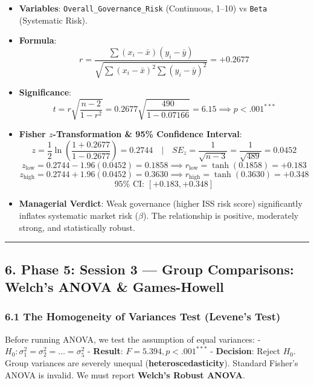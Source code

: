 \documentclass[
]{article}
\providecommand{\tightlist}{%
  \setlength{\itemsep}{0pt}\setlength{\parskip}{0pt}}
\begin{document}
\begin{itemize}
\tightlist
\item
  \textbf{Variables}: \texttt{Overall\_Governance\_Risk} (Continuous,
  1--10) vs \texttt{Beta} (Systematic Risk).
\item
  \textbf{Formula}:
  \[r = \frac{\sum (x_i - \bar{x})(y_i - \bar{y})}{\sqrt{\sum (x_i - \bar{x})^2 \sum (y_i - \bar{y})^2}} = +0.2677\]
\item
  \textbf{Significance}:
  \[t = r \sqrt{\frac{n - 2}{1 - r^2}} = 0.2677 \sqrt{\frac{490}{1 - 0.07166}} = 6.15 \implies p < .001^{***}\]
\item
  \textbf{Fisher \(z\)-Transformation \& 95\% Confidence Interval}:
  \[z = \frac{1}{2} \ln \left(\frac{1 + 0.2677}{1 - 0.2677}\right) = 0.2744 \quad | \quad SE_z = \frac{1}{\sqrt{n - 3}} = \frac{1}{\sqrt{489}} = 0.0452\]
  \[z_{\text{low}} = 0.2744 - 1.96(0.0452) = 0.1858 \implies r_{\text{low}} = \tanh(0.1858) = +0.183\]
  \[z_{\text{high}} = 0.2744 + 1.96(0.0452) = 0.3630 \implies r_{\text{high}} = \tanh(0.3630) = +0.348\]
  \[\text{95%
  \]
\item
  \textbf{Managerial Verdict}: Weak governance (higher ISS risk score)
  significantly inflates systematic market risk (\(\beta\)). The
  relationship is positive, moderately strong, and statistically robust.
\end{itemize}

\begin{center}\rule{0.5\linewidth}{0.5pt}\end{center}

\subsection{6. Phase 5: Session 3 --- Group Comparisons: Welch's ANOVA
\&
Games-Howell}\label{phase-5-session-3-group-comparisons-welchs-anova-games-howell}

\subsubsection{6.1 The Homogeneity of Variances Test (Levene's
Test)}\label{the-homogeneity-of-variances-test-levenes-test}

Before running ANOVA, we test the assumption of equal variances: -
\(H_0: \sigma_1^2 = \sigma_2^2 = \dots = \sigma_5^2\) - \textbf{Result}:
\(F = 5.394, p < .001^{***}\) - \textbf{Decision}: Reject \(H_0\). Group
variances are severely unequal (\textbf{heteroscedasticity}). Standard
Fisher's ANOVA is invalid. We must report \textbf{Welch's Robust ANOVA}.
\end{document}

